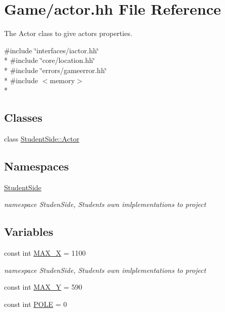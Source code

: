 \hypertarget{actor_8hh}{\section{Game/actor.hh File Reference}
\label{actor_8hh}
}


The Actor class to give actors properties.  


{\ttfamily \#include \char`\"{}interfaces/iactor.\-hh\char`\"{}}\\*
{\ttfamily \#include \char`\"{}core/location.\-hh\char`\"{}}\\*
{\ttfamily \#include \char`\"{}errors/gameerror.\-hh\char`\"{}}\\*
{\ttfamily \#include $<$memory$>$}\\*
\subsection*{Classes}
\begin{DoxyCompactItemize}
\item 
class \hyperlink{class_student_side_1_1_actor}{Student\-Side\-::\-Actor}
\end{DoxyCompactItemize}
\subsection*{Namespaces}
\begin{DoxyCompactItemize}
\item 
\hyperlink{namespace_student_side}{Student\-Side}
\begin{DoxyCompactList}\small\item\em namespace Studen\-Side, Students own imlplementations to project \end{DoxyCompactList}\end{DoxyCompactItemize}
\subsection*{Variables}
\begin{DoxyCompactItemize}
\item 
const int \hyperlink{actor_8hh_a0c83c007cb84afc390feef5197e1e772}{M\-A\-X\-\_\-\-X} = 1100
\begin{DoxyCompactList}\small\item\em namespace Studen\-Side, Students own imlplementations to project \end{DoxyCompactList}\item 
const int \hyperlink{actor_8hh_a3d568eb994147e9003c8def870db3d15}{M\-A\-X\-\_\-\-Y} = 590
\item 
const int \hyperlink{actor_8hh_ad6dbd24debdca3e21cadbdc23476ad8d}{P\-O\-L\-E} = 0
\end{DoxyCompactItemize}


